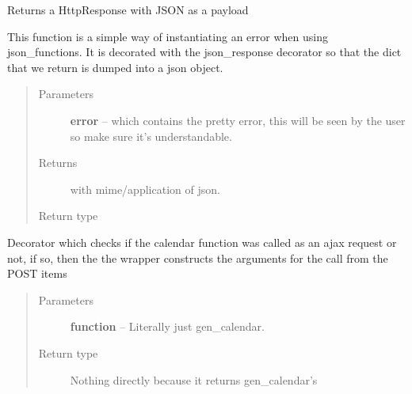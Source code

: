 \documentclass[letterpaper,10pt,english]{sphinxmanual}
\begin{document}
\begin{fulllineitems}
\label{timetracker:timetracker.utils.calendar_utils.ajax_error}
Returns a HttpResponse with JSON as a payload

This function is a simple way of instantiating an error when using
json\_functions. It is decorated with the json\_response decorator so that
the dict that we return is dumped into a json object.
\begin{quote}\begin{description}
\item[{Parameters}] \leavevmode
\textbf{error} --  which contains the pretty
error, this will be seen by the user so
make sure it's understandable.

\item[{Returns}] \leavevmode
{} with mime/application of json.

\item[{Return type}] \leavevmode
{}

\end{description}\end{quote}

\end{fulllineitems}


\begin{fulllineitems}
\label{timetracker:timetracker.utils.calendar_utils.calendar_wrapper}
Decorator which checks if the calendar function was
called as an ajax request or not, if so, then the
the wrapper constructs the arguments for the call
from the POST items
\begin{quote}\begin{description}
\item[{Parameters}] \leavevmode
\textbf{function} -- Literally just gen\_calendar.

\item[{Return type}] \leavevmode
Nothing directly because it returns gen\_calendar's

\end{description}\end{quote}

\end{fulllineitems}
\end{document}
